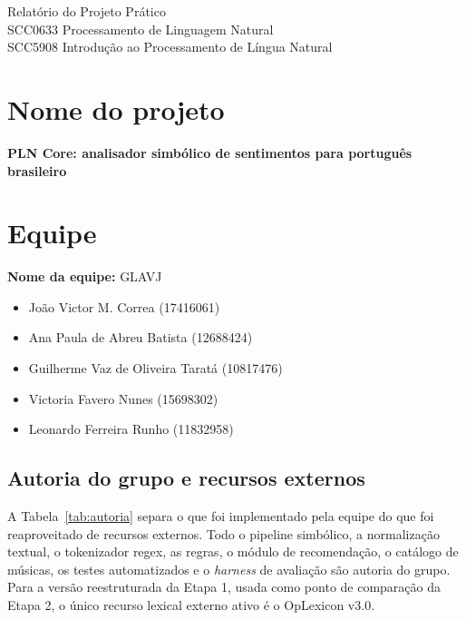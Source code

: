 \documentclass[11pt,a4paper]{article}
\begin{document}
\begin{center}
{\Large Relatório do Projeto Prático}\\[0.4em]
{\large SCC0633 Processamento de Linguagem Natural}\\[0.2em]
{\large SCC5908 Introdução ao Processamento de Língua Natural}\\[0.2em]
\end{center}

\section{Nome do projeto}

\textbf{PLN Core: analisador simbólico de sentimentos para português brasileiro}

\section{Equipe}

\textbf{Nome da equipe:} GLAVJ

\begin{itemize}
  \item João Victor M. Correa (17416061)
  \item Ana Paula de Abreu Batista (12688424)
  \item Guilherme Vaz de Oliveira Taratá (10817476)
  \item Victoria Favero Nunes (15698302)
  \item Leonardo Ferreira Runho (11832958)
\end{itemize}

\subsection{Autoria do grupo e recursos externos}

A Tabela~\ref{tab:autoria} separa o que foi implementado pela equipe do que foi reaproveitado de recursos externos. Todo o pipeline simbólico, a normalização textual, o tokenizador regex, as regras, o módulo de recomendação, o catálogo de músicas, os testes automatizados e o \emph{harness} de avaliação são autoria do grupo. Para a versão reestruturada da Etapa 1, usada como ponto de comparação da Etapa 2, o único recurso lexical externo ativo é o OpLexicon v3.0.
\end{document}
